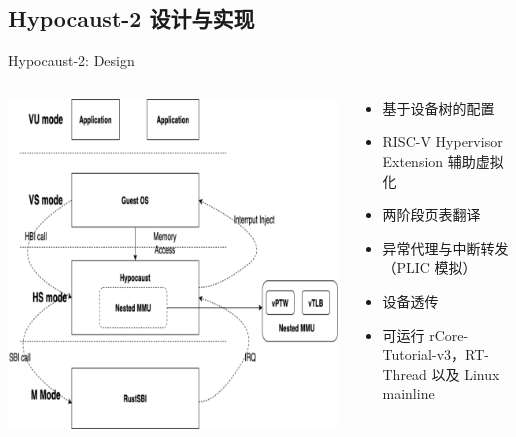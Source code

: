 \documentclass{beamer}
\begin{document}
  \subsection{Hypocaust-2 设计与实现}
    \begin{frame}{Hypocaust-2: Design}
  
    \begin{columns}
        \begin{column}{0.5\textwidth}
            \includegraphics[width=\linewidth]{pic/hypocaust-2-arch.png}          
        \end{column}
        \begin{column}{0.5\textwidth}
            \begin{itemize}
                \item 基于设备树的配置
                \item RISC-V Hypervisor Extension 辅助虚拟化
                \item 两阶段页表翻译
                \item 异常代理与中断转发（PLIC 模拟）
                \item 设备透传
                \item 可运行 rCore-Tutorial-v3，RT-Thread 以及 Linux mainline
            \end{itemize}
        \end{column}
    \end{columns}
  \end{frame}
\end{document}
